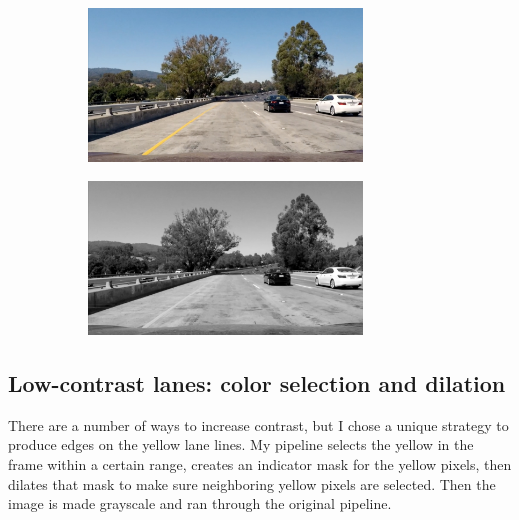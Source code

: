 \documentclass{article}
\begin{document}
\begin{figure}[htb!]
    \centering
    \caption{Low contrast lane in grayscale}
    
    \begin{subfigure}{0.5\textwidth}
    \centering
    \includegraphics[width=0.8\textwidth]{challenge}
    \end{subfigure}%
    \begin{subfigure}{0.5\textwidth}
    \centering
    \includegraphics[width=0.8\textwidth]{grayorig}
    \end{subfigure}
\end{figure}

\subsection{Low-contrast lanes: color selection and dilation}

There are a number of ways to increase contrast, but I chose a unique strategy to produce edges on the yellow lane lines. My pipeline selects the yellow in the frame within a certain range, creates an indicator mask for the yellow pixels, then dilates that mask to make sure neighboring yellow pixels are selected. Then the image is made grayscale and ran through the original pipeline.
\end{document}
